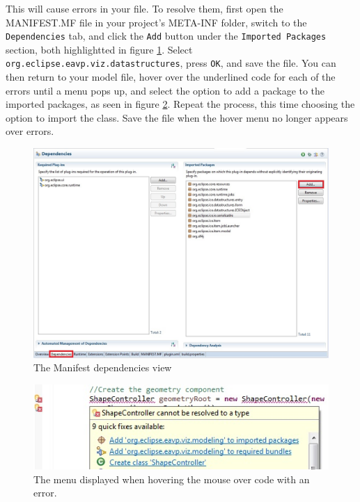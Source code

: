 This will cause errors in your file. To resolve them, first open the MANIFEST.MF
file in your project's META-INF folder, switch to the \texttt{Dependencies} tab,
and click the \texttt{Add} button under the \texttt{Imported Packages} section,
both highlightted in figure \ref{fig:manifest}. Select
\texttt{org.eclipse.eavp.viz.datastructures}, press \texttt{OK}, and save the
file. You can then return to your model file, hover over the underlined code
for each of the errors until a menu pops up, and select the option to add a
package to the imported packages, as seen in figure \ref{fig:hover}. Repeat the process, this time choosing the option to import the class. Save the file when the hover menu no longer appears over
errors.

\begin{figure}[!h]
\includegraphics[width=\textwidth]{images/ManifestDependencies}
\centering
\caption{The Manifest dependencies view}
\label{fig:manifest}
\end{figure}

\begin{figure}[!h]
\includegraphics[width=\textwidth]{images/ErrorHoverMenu}
\centering
\caption{The menu displayed when hovering the mouse over code with an error.}
\label{fig:hover}
\end{figure}

